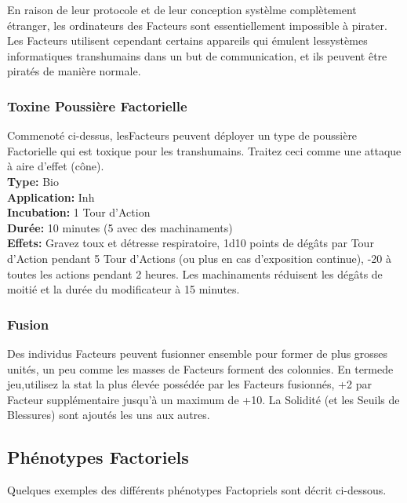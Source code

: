 En raison de leur protocole et de leur conception systèlme complètement étranger, les ordinateurs des Facteurs sont essentiellement impossible à pirater. Les Facteurs utilisent cependant certains appareils qui émulent lessystèmes informatiques transhumains dans un but de communication, et ils peuvent être piratés de manière normale. 

\subsubsection{Toxine Poussière Factorielle} 

Commenoté ci-dessus, lesFacteurs peuvent déployer un type de poussière Factorielle qui est toxique pour les transhumains. Traitez ceci comme une attaque à aire d'effet (cône). \\ \textbf{Type:} Bio \\ \textbf{Application:} Inh \\ \textbf{Incubation:} 1 Tour d'Action\\ \textbf{Durée:} 10 minutes (5 avec des machinaments) \\ \textbf{Effets:} Gravez toux et détresse respiratoire, 1d10 points de dégâts par Tour d'Action pendant 5 Tour d'Actions (ou plus en cas d'exposition continue), -20 à toutes les actions pendant 2 heures. Les machinaments réduisent les dégâts de moitié et la durée du modificateur à 15 minutes. 

\subsubsection{Fusion} 

Des individus Facteurs peuvent fusionner ensemble pour former de plus grosses unités, un peu comme les masses de Facteurs forment des colonnies. En termede jeu,utilisez la stat la plus élevée possédée par les Facteurs fusionnés, +2 par Facteur supplémentaire jusqu'à un maximum de +10. La Solidité (et les Seuils de Blessures) sont ajoutés les uns aux autres. 

\subsection{Phénotypes Factoriels} 

Quelques exemples des différents phénotypes Factopriels sont décrit ci-dessous. 

